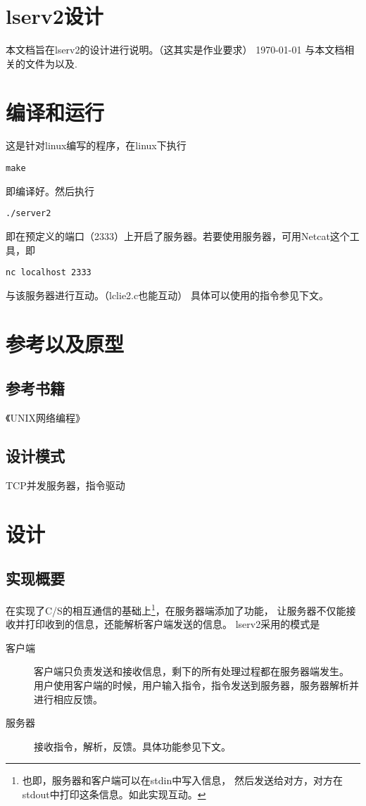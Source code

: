 \documentclass[a4paper,12pt]{article}
\begin{document}
\begin{CJK}{UTF8}{gbsn}

\section*{lserv2设计}
	本文档旨在lserv2的设计进行说明。（这其实是作业要求）\newline
	\today \newline
	与本文档相关的文件为以及.

\section{编译和运行}
	这是针对linux编写的程序，在linux下执行
	\begin{verbatim}
make
	\end{verbatim}
	即编译好。然后执行
	\begin{verbatim}
./server2
	\end{verbatim}
	即在预定义的端口（2333）上开启了服务器。若要使用服务器，可用Netcat这个工具，即
	\begin{verbatim}
nc localhost 2333
	\end{verbatim}
	与该服务器进行互动。（lclie2.c也能互动）\newline
	具体可以使用的指令参见下文。

\section{参考以及原型}
	\subsection{参考书籍}
		《UNIX网络编程》
	\subsection{设计模式}
		TCP并发服务器，指令驱动

\newpage
\section{设计}
	\subsection{实现概要}
		在实现了C/S的相互通信的基础上\footnote{也即，服务器和客户端可以在stdin中写入信息，
		然后发送给对方，对方在stdout中打印这条信息。如此实现互动。}，在服务器端添加了功能，
		让服务器不仅能接收并打印收到的信息，还能解析客户端发送的信息。\newline
		lserv2采用的模式是
		\begin{description}
		\item[客户端] 客户端只负责发送和接收信息，剩下的所有处理过程都在服务器端发生。
		用户使用客户端的时候，用户输入指令，指令发送到服务器，服务器解析并进行相应反馈。
		\item[服务器] 接收指令，解析，反馈。具体功能参见下文。
		\end{description}

\end{CJK}
\end{document}
